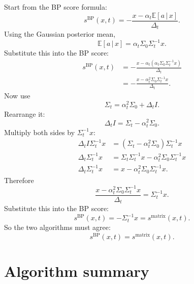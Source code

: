 \documentclass[11pt]{article}
\newcommand{\E}{\mathbb{E}}
\newcommand{\given}{\,|\,}
\begin{document}
Start from the BP score formula:
\begin{equation}
  s^{\mathrm{BP}}(x,t)
  =-\frac{x-\alpha_t\E[a\given x]}{\Delta_t}.
\end{equation}
Using the Gaussian posterior mean,
\begin{equation}
  \E[a\given x]=\alpha_t\Sigma_0\Sigma_t^{-1}x.
\end{equation}
Substitute this into the BP score:
\begin{align}
  s^{\mathrm{BP}}(x,t)
  &=-\frac{x-\alpha_t(\alpha_t\Sigma_0\Sigma_t^{-1}x)}{\Delta_t} \\
  &=-\frac{x-\alpha_t^2\Sigma_0\Sigma_t^{-1}x}{\Delta_t}.
\end{align}
Now use
\begin{equation}
  \Sigma_t=\alpha_t^2\Sigma_0+\Delta_t I.
\end{equation}
Rearrange it:
\begin{equation}
  \Delta_t I=\Sigma_t-\alpha_t^2\Sigma_0.
\end{equation}
Multiply both sides by \(\Sigma_t^{-1}x\):
\begin{align}
  \Delta_t I\Sigma_t^{-1}x
  &=(\Sigma_t-\alpha_t^2\Sigma_0)\Sigma_t^{-1}x \\
  \Delta_t\Sigma_t^{-1}x
  &=\Sigma_t\Sigma_t^{-1}x-\alpha_t^2\Sigma_0\Sigma_t^{-1}x \\
  \Delta_t\Sigma_t^{-1}x
  &=x-\alpha_t^2\Sigma_0\Sigma_t^{-1}x.
\end{align}
Therefore
\begin{equation}
  \frac{x-\alpha_t^2\Sigma_0\Sigma_t^{-1}x}{\Delta_t}
  =\Sigma_t^{-1}x.
\end{equation}
Substitute this into the BP score:
\begin{equation}
  s^{\mathrm{BP}}(x,t)
  =-\Sigma_t^{-1}x
  =s^{\mathrm{matrix}}(x,t).
\end{equation}
So the two algorithms must agree:
\begin{equation}
  \boxed{
  s^{\mathrm{BP}}(x,t)=s^{\mathrm{matrix}}(x,t).
  }
\end{equation}

\section{Algorithm summary}
\end{document}
